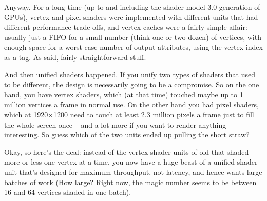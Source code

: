 \documentclass[12pt]{article}
\begin{document}
Anyway. For a long time (up to and including the shader model 3.0 generation of GPUs), vertex and pixel shaders were implemented with different units that had different performance trade-offs, and vertex caches were a fairly simple affair: usually just a FIFO for a small number (think one or two dozen) of vertices, with enough space for a worst-case number of output attributes, using the vertex index as a tag.
As said, fairly straightforward stuff.

And then unified shaders happened.
If you unify two types of shaders that used to be different, the design is necessarily going to be a compromise.
So on the one hand, you have vertex shaders, which (at that time) touched maybe up to 1 million vertices a frame in normal use.
On the other hand you had pixel shaders, which at 1920×1200 need to touch at least 2.3 million pixels a frame just to fill the whole screen once – and a lot more if you want to render anything interesting.
So guess which of the two units ended up pulling the short straw?

Okay, so here’s the deal: instead of the vertex shader units of old that shaded more or less one vertex at a time, you now have a huge beast of a unified shader unit that’s designed for maximum throughput, not latency, and hence wants large batches of work (How large? Right now, the magic number seems to be between 16 and 64 vertices shaded in one batch).
\end{document}
